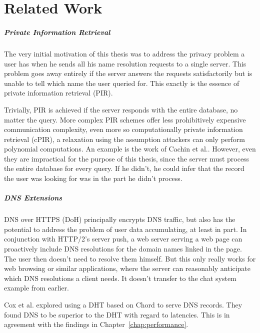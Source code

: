 \chapter{Related Work}
\label{chap:related_work}
\paragraph{Private Information Retrieval}
The very initial motivation of this thesis was to address the privacy problem a
user has when he sends all his name resolution requests to a single server. This
problem goes away entirely if the server answers the requests satisfactorily but
is unable to tell which name the user queried for. This exactly is the essence
of private information retrieval (PIR)\cite{gasarch2004survey}.

Trivially, PIR is achieved if the server responds with the entire database, no
matter the query. More complex PIR schemes offer less prohibitively expensive
communication complexity, even more so computationally private information
retrieval (cPIR), a relaxation using the assumption attackers can only perform
polynomial computations. An example is the work of Cachin et
al.\cite{cachin1999computationally}. However, even they are impractical for the
purpose of this thesis, since the server must process the entire database for
every query. If he didn't, he could infer that the record the user was looking
for was in the part he didn't process.

\paragraph{DNS Extensions}
DNS over HTTPS (DoH)\cite{RFC8484} principally encrypts DNS traffic, but also
has the potential to address the problem of user data accumulating, at least in
part. In conjunction with HTTP/2's server push\cite{RFC7540}, a web server
serving a web page can proactively include DNS resolutions for the domain names
linked in the page. The user then doesn't need to resolve them himself. But this
only really works for web browsing or similar applications, where the server can
reasonably anticipate which DNS resolutions a client needs. It doesn't transfer
to the chat system example from earlier.

Cox et al.\cite{cox2002serving} explored using a DHT based on Chord to serve
DNS records. They found DNS to be superior to the DHT with regard to latencies.
This is in agreement with the findings in Chapter~\ref{chap:performance}.


